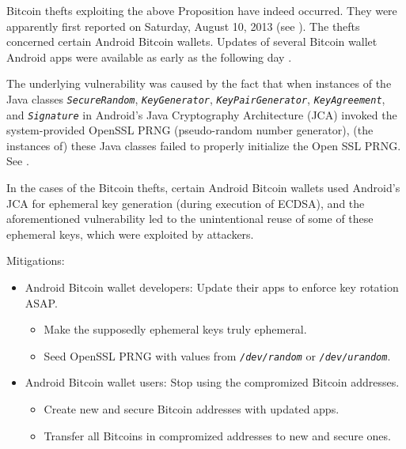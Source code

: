 \begin{remark}
\mbox{}
\vskip 0.1cm
\noindent
Bitcoin thefts exploiting the above Proposition have indeed occurred.
They were apparently first reported on Saturday, August 10, 2013
(see \cite{BitcoinTalk20130810}).
The thefts concerned certain Android Bitcoin wallets.
Updates of several Bitcoin wallet Android apps were available
as early as the following day \cite{BitcoinOrg20130811}.

The underlying vulnerability was caused by the fact that
when instances of the Java classes
\emph{\texttt{SecureRandom}}, \emph{\texttt{KeyGenerator}},
\emph{\texttt{KeyPairGenerator}}, \emph{\texttt{KeyAgreement}}, and
\emph{\texttt{Signature}} in Android's Java Cryptography Architecture (JCA)
invoked the system-provided OpenSSL PRNG
(pseudo-random number generator),
(the instances of) these Java classes failed to properly initialize
the Open SSL PRNG. See \cite{AndroidDev20130814}.

In the cases of the Bitcoin thefts, certain Android Bitcoin wallets used
Android's JCA for ephemeral key generation (during execution of ECDSA),
and the aforementioned vulnerability led to the unintentional reuse of some
of these ephemeral keys, which were exploited by attackers.

\vskip 0.3cm
\noindent
Mitigations:
\begin{itemize}
\item
	Android Bitcoin wallet developers: Update their apps to enforce key
	rotation ASAP.
	\begin{itemize}
	\item
		Make the supposedly ephemeral keys truly ephemeral.
	\item
		Seed OpenSSL PRNG with values from
		\emph{\texttt{/dev/random}} or \emph{\texttt{/dev/urandom}}.
	\end{itemize}
\item
	Android Bitcoin wallet users:
	Stop using the compromized Bitcoin addresses.
	\begin{itemize}
	\item
		Create new and secure Bitcoin addresses with updated apps.
	\item
		Transfer all Bitcoins in compromized addresses to new and secure ones.
	\end{itemize}
\end{itemize}
\end{remark}

